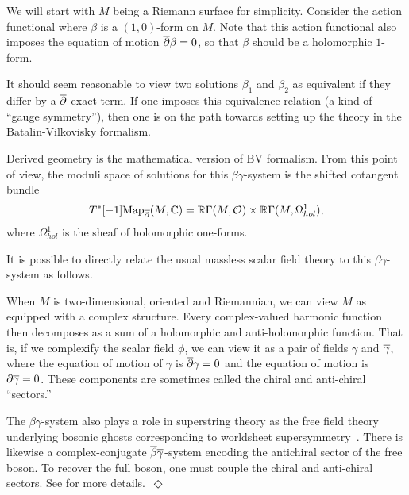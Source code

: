 \documentclass[11pt]{amsart}
\def\owen#1{{\textcolor{red!50!black}{OG: {#1}}}}
\begin{document}
We will start with $M$ being a Riemann surface for simplicity.
Consider the action functional
\beqn
\label{eqn: 1d betagamma}
\int \beta \wedge \dbar \gamma
\eeqn
where $\beta$ is a $(1,0)$-form on $M$.%
Note that this action functional also imposes the equation of motion $\dbar \beta = 0$,
so that $\beta$ should be a holomorphic $1$-form.

It should seem reasonable to view two solutions $\beta_1$ and $\beta_2$ as equivalent if they differ by a $\dbar$-exact term.
If one imposes this equivalence relation (a kind of ``gauge symmetry''),
then one is on the path towards setting up the theory in the Batalin-Vilkovisky formalism.

Derived geometry is the mathematical version of BV formalism.
From this point of view, the moduli space of solutions for this $\beta\gamma$-system is the shifted cotangent bundle
\[
T^*[-1] \Map_\dbar(M,\CC) = \RR\Gamma(M,\cO) \times \RR\Gamma(M,\Omega^1_{hol}),
\]
where $\Omega^1_{hol}$ is the sheaf of holomorphic one-forms.

\begin{rmk}
It is possible to directly relate the usual massless scalar field theory to this $\beta\gamma$-system as follows.

When $M$ is two-dimensional, oriented and Riemannian,
we can view $M$ as equipped with a complex structure.
Every complex-valued harmonic function then decomposes as a sum of a holomorphic and anti-holomorphic function. 
That is, if we complexify the scalar field $\phi$, 
we can view it as a pair of fields $\gamma$ and $\Bar{\gamma}$,
where the equation of motion of $\gamma$ is $\dbar \gamma = 0$ and the equation of motion is $\partial \Bar{\gamma} = 0$.
These components are sometimes called the chiral and anti-chiral ``sectors.'' 

The $\beta\gamma$-system also plays a role in superstring theory as the free field theory underlying bosonic ghosts corresponding to worldsheet supersymmetry~\cite[Chapter 3]{Polchinski}.
There is likewise a complex-conjugate $\Bar{\beta}\Bar{\gamma}$-system encoding the antichiral sector of the free boson.
To recover the full boson, one must couple the chiral and anti-chiral sectors.
See \cite{Kapustin:2005pt,GGW} for more details.~\hfill$\Diamond$
\end{rmk}
\end{document}
